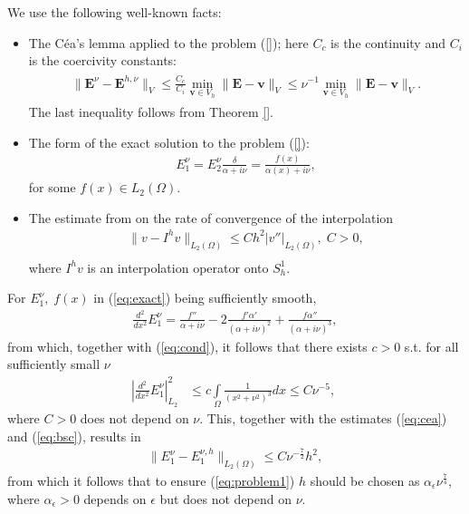 We use the following well-known facts:
\begin{itemize}
 \item The C\'ea's lemma applied to the problem (\ref{}); here $C_c$ is the continuity and $C_i$ is the coercivity constants:
\begin{align}
\label{eq:cea}
\begin{split}
 \|\mathbf{E}^{\nu}-\mathbf{E}^{h,\nu}\|_{V}\leq \frac{C_c}{C_i}\min_{\mathbf{v}\in V_h}\|\mathbf{E}-\mathbf{v}\|_{V}
 \leq \nu^{-1}\min_{\mathbf{v}\in V_h}\|\mathbf{E}-\mathbf{v}\|_{V}.
 \end{split}
\end{align}
The last inequality follows from Theorem \ref{}.  
\item The form of the exact solution to the problem (\ref{}):
\begin{align}
\label{eq:exact}
 E_{1}^{\nu}=E_{2}^{\nu}\frac{\delta}{\alpha+i\nu}=\frac{f(x)}{\alpha(x)+i\nu},
\end{align}
for some $f(x)\in L_{2}(\Omega)$.
\item The estimate from \cite[Chapter 0]{Brenner_Scott} on the rate of convergence of the interpolation 
\begin{align}
\label{eq:bsc}
 \|v-I^{h}v\|_{L_{2}(\Omega)}\leq Ch^2|v''|_{L_{2}(\Omega)},\; C>0,\\
\end{align}
where $I^{h}v$ is an interpolation operator onto $S_{h}^{1}$.
\end{itemize}
For $E_{1}^{\nu},\;f(x)$ in (\ref{eq:exact}) being sufficiently smooth, 
\begin{align*}
 \frac{d^2}{dx^2}E_{1}^{\nu}=\frac{f''}{\alpha+i\nu}-2\frac{f'\alpha'}{(\alpha+i\nu)^2}+\frac{f\alpha''}{(\alpha+i\nu)^3},
\end{align*}
from which, together with (\ref{eq:cond}), it follows that there exists $c>0$ s.t. for all sufficiently small $\nu$ 
\begin{align*}
 \left|  \frac{d^2}{dx^2}E_{1}^{\nu}\right|_{L_2}^{2}&\leq c\int\limits_{\Omega}\frac{1}{(x^2+\nu^2)^{3}}dx
 \leq C\nu^{-5},\; 
\end{align*}
where $C>0$ does not depend on $\nu$. This, together with the estimates (\ref{eq:cea}) and (\ref{eq:bsc}), results in 
\begin{align*}
 \|E^{\nu}_{1}-E^{\nu,h}_{1}\|_{L_{2}(\Omega)}\leq C\nu^{-\frac{7}{2}}h^2,
\end{align*}
from which it follows that to ensure (\ref{eq:problem1}) $h$ should be chosen as $\alpha_{\epsilon}\nu^{\frac{7}{4}}$, 
where $\alpha_{\epsilon}>0$ depends on $\epsilon$ but does not depend on $\nu$. 

